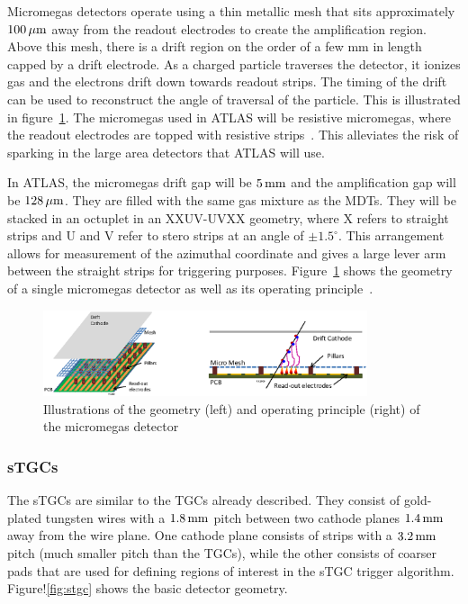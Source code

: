 Micromegas detectors operate using a thin metallic mesh that sits approximately $100\,\mu \rm m$ away from the readout electrodes to create the amplification region. Above this mesh, there is a drift region on the order of a few mm in length capped by a drift electrode. As a charged particle traverses the detector, it ionizes gas and the electrons drift down towards readout strips. The timing of the drift can be used to reconstruct the angle of traversal of the particle. This is illustrated in figure~\ref{fig:mm}. The micromegas used in ATLAS will be resistive micromegas, where the readout electrodes are topped with resistive strips~\cite{ResistiveMM}. This alleviates the risk of sparking in the large area detectors that ATLAS will use.

In ATLAS, the micromegas drift gap will be $5\,\rm mm$ and the amplification gap will be $128\,\mu \rm m$. They are filled with the same gas mixture as the MDTs. They will be stacked in an octuplet in an XXUV-UVXX geometry, where X refers to straight strips and U and V refer to stero strips at an angle of $\pm 1.5^\circ$. This arrangement allows for measurement of the azimuthal coordinate and gives a large lever arm between the straight strips for triggering purposes. Figure~\ref{fig:mm} shows the geometry of a single micromegas detector as well as its operating principle~\cite{NSW_TDR}. 

\begin{figure}[h!]
  \centering
  \captionsetup{justification=centering}

  \includegraphics[width=0.85\textwidth]{figures/MM}
   \caption{Illustrations of the geometry (left) and operating principle (right) of the micromegas detector~\cite{NSW_TDR}}
  \label{fig:mm}
\end{figure}

\subsubsection{sTGCs}

The sTGCs are similar to the TGCs already described. They consist of gold-plated tungsten wires with a $1.8\,\rm mm$ pitch between two cathode planes $1.4\, \rm mm$ away from the wire plane. One cathode plane consists of strips with a $3.2\,\rm mm$ pitch (much smaller pitch than the TGCs), while the other consists of coarser pads that are used for defining regions of interest in the sTGC trigger algorithm. Figure!\ref{fig:stgc} shows the basic detector geometry. 

